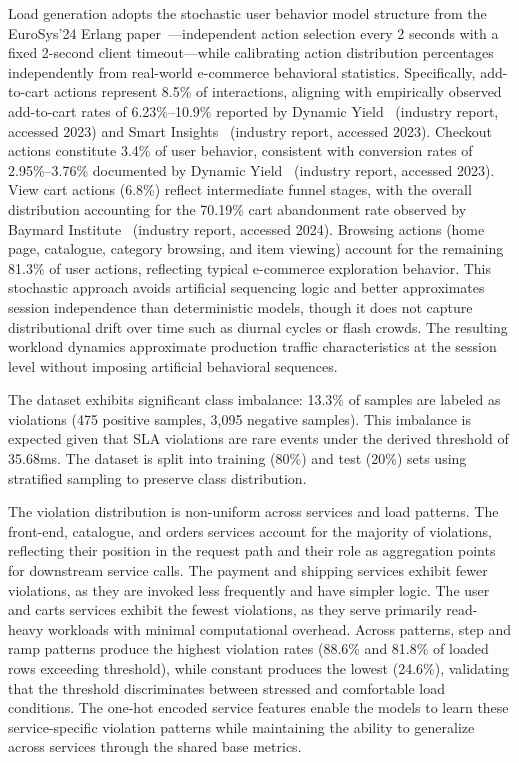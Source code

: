 \documentclass[conference]{IEEEtran}
\begin{document}
Load generation adopts the stochastic user behavior model structure from the EuroSys'24 Erlang paper~\cite{erlang}---independent action selection every 2 seconds with a fixed 2-second client timeout---while calibrating action distribution percentages independently from real-world e-commerce behavioral statistics. Specifically, add-to-cart actions represent 8.5\% of interactions, aligning with empirically observed add-to-cart rates of 6.23\%--10.9\% reported by Dynamic Yield~\cite{dynamicyield} (industry report, accessed 2023) and Smart Insights~\cite{smartinsights} (industry report, accessed 2023). Checkout actions constitute 3.4\% of user behavior, consistent with conversion rates of 2.95\%--3.76\% documented by Dynamic Yield~\cite{dynamicyield} (industry report, accessed 2023). View cart actions (6.8\%) reflect intermediate funnel stages, with the overall distribution accounting for the 70.19\% cart abandonment rate observed by Baymard Institute~\cite{baymard} (industry report, accessed 2024). Browsing actions (home page, catalogue, category browsing, and item viewing) account for the remaining 81.3\% of user actions, reflecting typical e-commerce exploration behavior. This stochastic approach avoids artificial sequencing logic and better approximates session independence than deterministic models, though it does not capture distributional drift over time such as diurnal cycles or flash crowds. The resulting workload dynamics approximate production traffic characteristics at the session level without imposing artificial behavioral sequences.

The dataset exhibits significant class imbalance: 13.3\% of samples are labeled as violations (475 positive samples, 3,095 negative samples). This imbalance is expected given that SLA violations are rare events under the derived threshold of 35.68ms. The dataset is split into training (80\%) and test (20\%) sets using stratified sampling to preserve class distribution.

The violation distribution is non-uniform across services and load patterns. The front-end, catalogue, and orders services account for the majority of violations, reflecting their position in the request path and their role as aggregation points for downstream service calls. The payment and shipping services exhibit fewer violations, as they are invoked less frequently and have simpler logic. The user and carts services exhibit the fewest violations, as they serve primarily read-heavy workloads with minimal computational overhead. Across patterns, step and ramp patterns produce the highest violation rates (88.6\% and 81.8\% of loaded rows exceeding threshold), while constant produces the lowest (24.6\%), validating that the threshold discriminates between stressed and comfortable load conditions. The one-hot encoded service features enable the models to learn these service-specific violation patterns while maintaining the ability to generalize across services through the shared base metrics.
\end{document}
